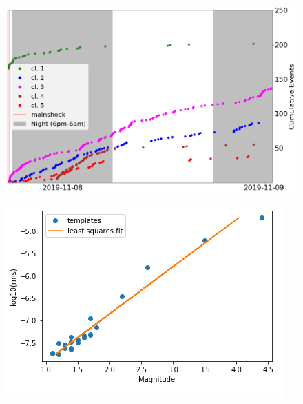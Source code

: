 \documentclass[a4paper,12pt]{article}
\begin{document}
\begin{figure}[!h]
\renewcommand{\thefigure}{S\arabic{figure}}
\begin{center}
 \includegraphics[width=0.8\linewidth]{S4_cumulative_per_cluster_zoom.png} 
\end{center}
\label{fig:S4_fig3_zoom}
\end{figure}

\begin{figure}[!h]
\renewcommand{\thefigure}{S\arabic{figure}}
\begin{center}
 \includegraphics[width=0.8\linewidth]{S5_lsq_model.png} 
\end{center}
\label{fig:S5_lsq_model}
\end{figure}
\end{document}
